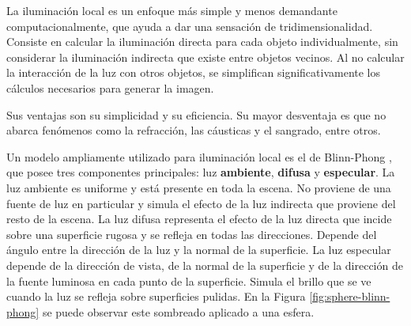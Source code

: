La iluminación local es un enfoque más simple y menos demandante computacionalmente, que ayuda a dar una sensación de tridimensionalidad.
Consiste en calcular la iluminación directa para cada objeto individualmente, sin considerar la iluminación indirecta que existe entre objetos vecinos.
Al no calcular la interacción de la luz con otros objetos, se simplifican significativamente los cálculos necesarios para generar la imagen.

Sus ventajas son su simplicidad y su eficiencia.
Su mayor desventaja es que no abarca fenómenos como la refracción, las cáusticas y el sangrado, entre otros.

Un modelo ampliamente utilizado para iluminación local es el de Blinn-Phong \cite{blinn-phong}, que posee tres componentes principales: luz \textbf{ambiente}, \textbf{difusa} y \textbf{especular}.
La luz ambiente es uniforme y está presente en toda la escena.
No proviene de una fuente de luz en particular y simula el efecto de la luz indirecta que proviene del resto de la escena.
La luz difusa representa el efecto de la luz directa que incide sobre una superficie rugosa y se refleja en todas las direcciones.
Depende del ángulo entre la dirección de la luz y la normal de la superficie.
La luz especular depende de la dirección de vista, de la normal de la superficie y de la dirección de la fuente luminosa en cada punto de la superficie.
Simula el brillo que se ve cuando la luz se refleja sobre superficies pulidas.
En la Figura \ref{fig:sphere-blinn-phong} se puede observar este sombreado aplicado a una esfera.

